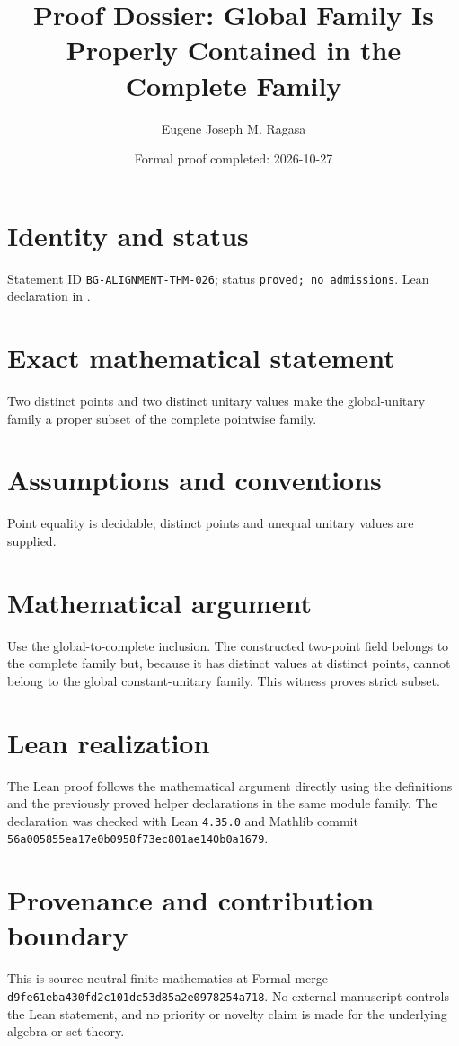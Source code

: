 \documentclass[11pt]{article}
\title{Proof Dossier: Global Family Is Properly Contained in the Complete Family}
\author{Eugene Joseph M. Ragasa}
\date{Formal proof completed: 2026-10-27}
\begin{document}
\raggedright
\maketitle

\section{Identity and status}
Statement ID \texttt{BG-ALIGNMENT-THM-026}; status \texttt{proved; no admissions}.  Lean declaration
 in
.

\section{Exact mathematical statement}
Two distinct points and two distinct unitary values make the global-unitary family a proper subset of the complete pointwise family.

\section{Assumptions and conventions}
Point equality is decidable; distinct points and unequal unitary values are supplied.

\section{Mathematical argument}
Use the global-to-complete inclusion.  The constructed two-point field belongs to the complete family but, because it has distinct values at distinct points, cannot belong to the global constant-unitary family.  This witness proves strict subset.

\section{Lean realization}
The Lean proof follows the mathematical argument directly using the definitions and the
previously proved helper declarations in the same module family.  The declaration was checked
with Lean \texttt{4.35.0} and Mathlib commit \texttt{56a005855ea17e0b0958f73ec801ae140b0a1679}.

\section{Provenance and contribution boundary}
This is source-neutral finite mathematics at Formal merge
\texttt{d9fe61eba430fd2c101dc53d85a2e0978254a718}.  No external manuscript controls the Lean statement, and no priority or
novelty claim is made for the underlying algebra or set theory.
\end{document}
